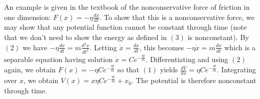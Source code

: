 \documentclass[a4paper]{article}
\begin{document}
An example is given in the textbook of the nonconservative force of friction in one dimension: $F(x) = -\eta \frac{dx}{dt}$. To show that this is a nonconservative force, we may show that any potential function cannot be constant through time (note that we don't need to show the energy as defined in $(3)$ is nonconstant). By $(2)$ we have $-\eta \frac{dx}{dt} = m\frac{d^2x}{dt^2}$. Letting $\dot{x} = \frac{dx}{dt}$, this becomes $-\eta \dot{x} = m\frac{d\dot{x}}{dt}$ which is a separable equation having solution $\dot{x} = Ce^{-\frac{\eta t}{m}}$. Differentiating and using $(2)$ again, we obtain $F(x) = -\eta Ce^{-\frac{\eta t}{m}}$ so that $(1)$ yields $\frac{dV}{dx} = \eta Ce^{-\frac{\eta t}{m}}$. Integrating over $x$, we obtain $V(x) = x\eta Ce^{-\frac{\eta t}{m}} + x_0$. The potential is therefore nonconstant through time.
\end{document}
